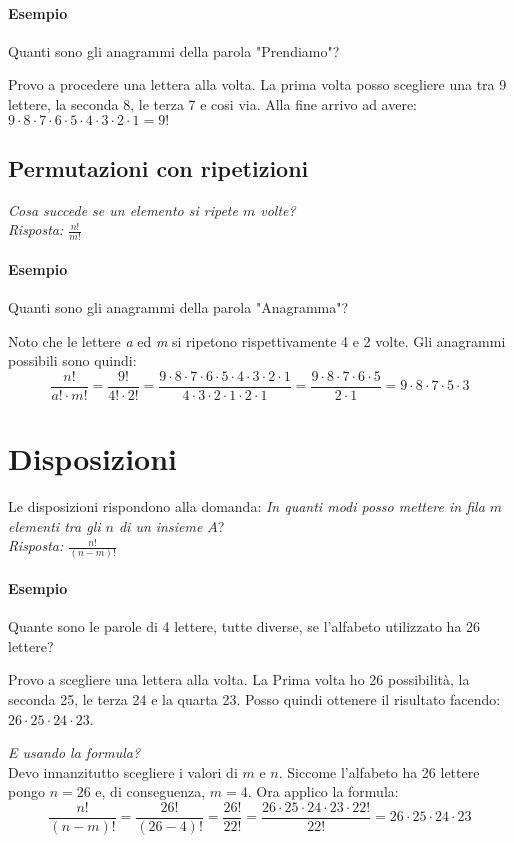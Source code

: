 \documentclass[12pt, a4paper]{report}
\theoremstyle{definition}
\begin{document}
\paragraph*{Esempio}
Quanti sono gli anagrammi della parola "Prendiamo"? 

Provo a procedere una lettera alla volta. La prima volta posso scegliere una tra
9 lettere, la seconda 8, le terza 7 e cosi via. Alla fine arrivo ad avere:
\(9\cdot 8\cdot 7\cdot 6\cdot 5\cdot 4\cdot 3\cdot 2\cdot 1 = 9!\)

\subsection{Permutazioni con ripetizioni}
\textit{Cosa succede se un elemento si ripete $m$ volte?}
\\\textit{Risposta: $\frac{n!}{m!}$}

\paragraph*{Esempio}
Quanti sono gli anagrammi della parola "Anagramma"?

Noto che le lettere \emph{a} ed \emph{m} si ripetono rispettivamente 4 e 2 volte.
Gli anagrammi possibili sono quindi:
\[\frac{n!}{a!\cdot  m!} = \frac{9!}{4!\cdot 2!} = \frac{9\cdot 8\cdot 7\cdot 6\cdot 5\cdot 4\cdot 3\cdot 2\cdot 1}{4\cdot 3\cdot 2\cdot 1\cdot 2\cdot 1}
= \frac{9\cdot 8\cdot 7\cdot 6\cdot 5}{2\cdot 1} = 9\cdot 8\cdot 7\cdot 5\cdot 3\]

\section{Disposizioni}
Le disposizioni rispondono alla domanda: \textit{In quanti modi posso mettere in
fila $m$ elementi tra gli $n$ di un insieme $A$}?
\\\textit{Risposta: \(\frac{n!}{(n-m)!}\)}

\paragraph*{Esempio}
Quante sono le parole di 4 lettere, tutte diverse, se l'alfabeto utilizzato
ha 26 lettere?

Provo a scegliere una lettera alla volta.
La Prima volta ho 26 possibilità, la seconda 25, le terza 24 e la quarta 23.
Posso quindi ottenere il risultato facendo: $26\cdot 25\cdot 24\cdot 23$.

\textit{E usando la formula?}
\\Devo innanzitutto scegliere i valori di $m$ e $n$. Siccome l'alfabeto ha 26
lettere pongo $n=26$ e, di conseguenza, $m=4$. Ora applico la formula:
\[\frac{n!}{(n-m)!} = \frac{26!}{(26 - 4)!} = \frac{26!}{22!} = 
\frac{26\cdot 25\cdot 24\cdot 23\cdot 22!}{22!} = 26\cdot 25\cdot 24\cdot 23\]
\end{document}
